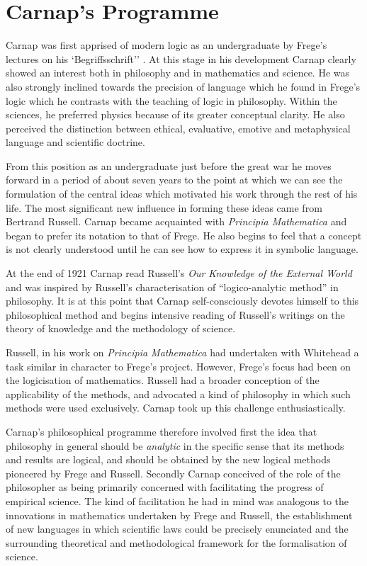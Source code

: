 \section{Carnap's Programme}

Carnap was first apprised of modern logic as an undergraduate by
Frege's lectures on his `Begriffsschrift''
\cite{frege1879,heijenoort67}. 
At this stage in his development Carnap clearly showed an interest
both in philosophy and in mathematics and science. 
He was also strongly inclined towards the precision of language which
he found in Frege's logic which he contrasts with the teaching of
logic in philosophy. 
Within the sciences, he preferred physics because of its greater
conceptual clarity. 
He also perceived the distinction between ethical, evaluative, emotive
and metaphysical language and scientific doctrine. 

From this position as an undergraduate just before the great war he
moves forward in a period of about seven years to the point at which
we can see the formulation of the central ideas which motivated his
work through the rest of his life. 
The most significant new influence in forming these ideas came from
Bertrand Russell. 
Carnap became acquainted with \emph{Principia
  Mathematica}\cite{russell10} and began to prefer its notation to
that of Frege. 
He also begins to feel that a concept is not clearly understood until
he can see how to express it in symbolic language. 

At the end of 1921 Carnap read Russell's \emph{Our Knowledge of the
  External World}\cite{russell1921} and was inspired by Russell's
characterisation of ``logico-analytic method'' in philosophy. 
It is at this point that Carnap self-consciously devotes himself to
this philosophical method and begins intensive reading of Russell's
writings on the theory of knowledge and the methodology of science. 

Russell, in his work on \emph{Principia Mathematica} had undertaken
with Whitehead a task similar in character to Frege's project. 
However, Frege's focus had been on the logicisation of mathematics.
Russell had a broader conception of the applicability of the methods,
and advocated a kind of philosophy in which such methods were used
exclusively. 
Carnap took up this challenge enthusiastically.

Carnap's philosophical programme therefore involved first the idea
that philosophy in general should be \emph{analytic} in the specific
sense that its methods and results are logical, and should be obtained
by the new logical methods pioneered by Frege and Russell. 
Secondly Carnap conceived of the role of the philosopher as being
primarily concerned with facilitating the progress of empirical
science. 
The kind of facilitation he had in mind was analogous to the
innovations in mathematics undertaken by Frege and Russell, the
establishment of new languages in which scientific laws could be
precisely enunciated and the surrounding theoretical and
methodological framework for the formalisation of science. 

